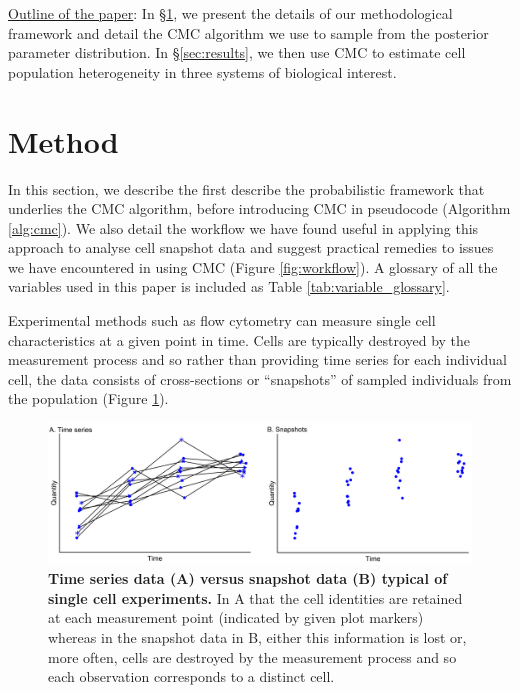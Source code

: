\documentclass[10pt,letterpaper]{article}
\begin{document}
\underline{Outline of the paper}: In \S \ref{sec:method}, we present the details of our methodological framework and detail the CMC algorithm we use to sample from the posterior parameter distribution. In \S \ref{sec:results}, we then use CMC to estimate cell population heterogeneity in three systems of biological interest.

\section{Method}\label{sec:method}
In this section, we describe the first describe the probabilistic framework that underlies the CMC algorithm, before introducing CMC in pseudocode (Algorithm \ref{alg:cmc}). We also detail the workflow we have found useful in applying this approach to analyse cell snapshot data and suggest practical remedies to issues we have encountered in using CMC (Figure \ref{fig:workflow}). A glossary of all the variables used in this paper is included as Table \ref{tab:variable_glossary}.

Experimental methods such as flow cytometry can measure single cell characteristics at a given point in time. Cells are typically destroyed by the measurement process and so rather than providing time series for each individual cell, the data consists of cross-sections or ``snapshots'' of sampled individuals from the population (Figure \ref{fig:time_series_v_snapshots}).

\begin{figure}[H]
	\centerline{\includegraphics[width=\textwidth]{../figures/time_series_v_snapshots.pdf}}
	\caption{\textbf{Time series data (A) versus snapshot data (B) typical of single cell experiments.} In A that the cell identities are retained at each measurement point (indicated by given plot markers) whereas in the snapshot data in B, either this information is lost or, more often, cells are destroyed by the measurement process and so each observation corresponds to a distinct cell.}
	\label{fig:time_series_v_snapshots}
\end{figure}
\end{document}
